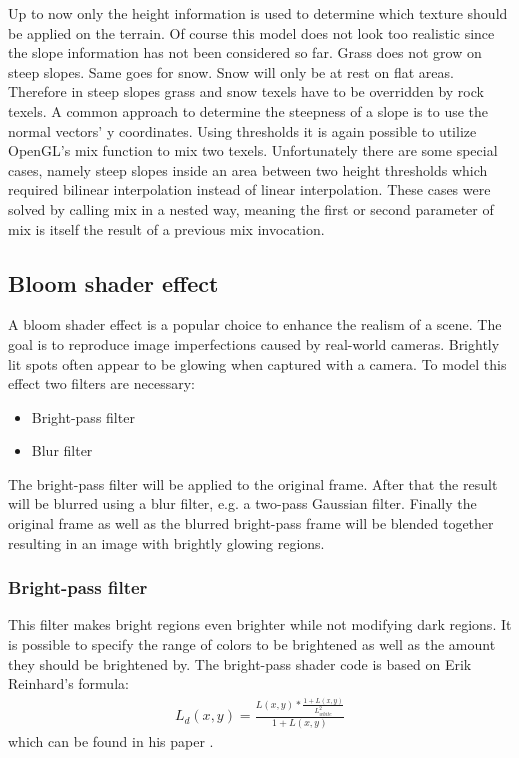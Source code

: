 \documentclass[11pt,a4paper,twoside,openright]{report}
\begin{document}
Up to now only the height information is used to determine which texture should be applied on the terrain. Of course this model does not look too realistic since the slope information has not been considered so far. Grass does not grow on steep slopes. Same goes for snow. Snow will only be at rest on flat areas. Therefore in steep slopes grass and snow texels have to be overridden by rock texels. A common approach to determine the steepness of a slope is to use the normal vectors' y coordinates. Using thresholds it is again possible to utilize OpenGL's mix function to mix two texels. Unfortunately there are some special cases, namely steep slopes inside an area between two height thresholds which required bilinear interpolation instead of linear interpolation. These cases were solved by calling mix in a nested way, meaning the first or second parameter of mix is itself the result of a previous mix invocation.

\subsection{Bloom shader effect}
A bloom shader effect is a popular choice to enhance the realism of a scene. The goal is to reproduce image imperfections caused by real-world cameras. Brightly lit spots often appear to be glowing when captured with a camera. To model this effect two filters are necessary:
\begin{itemize}
\item Bright-pass filter
\item Blur filter
\end{itemize}
The bright-pass filter will be applied to the original frame. After that the result will be blurred using a blur filter, e.g. a two-pass Gaussian filter. Finally the original frame as well as the blurred bright-pass frame will be blended together resulting in an image with brightly glowing regions.

\subsubsection{Bright-pass filter}
This filter makes bright regions even brighter while not modifying dark regions. It is possible to specify the range of colors to be brightened as well as the amount they should be brightened by. The bright-pass shader code is based on Erik Reinhard's formula:
\begin{align*}
L_d(x,y) = \frac{L(x,y) * \frac{1 + L(x,y)}{L_{white}^2}}{1 + L(x,y)}
\end{align*}
which can be found in his paper \cite{Reinhard:2002:PTR:566570.566575}.
\end{document}

